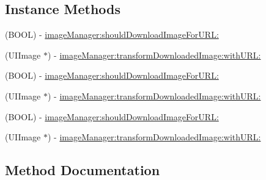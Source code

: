 \subsection*{Instance Methods}
\begin{DoxyCompactItemize}
\item 
(B\+O\+OL) -\/ \mbox{\hyperlink{protocol_s_d_web_image_manager_delegate_01-p_abb8b74284f0c06034a5a3b4f5da4f45e}{image\+Manager\+:should\+Download\+Image\+For\+U\+R\+L\+:}}
\item 
(U\+I\+Image $\ast$) -\/ \mbox{\hyperlink{protocol_s_d_web_image_manager_delegate_01-p_a6d50b06d616092913f7a99093723638e}{image\+Manager\+:transform\+Downloaded\+Image\+:with\+U\+R\+L\+:}}
\item 
(B\+O\+OL) -\/ \mbox{\hyperlink{protocol_s_d_web_image_manager_delegate_01-p_abb8b74284f0c06034a5a3b4f5da4f45e}{image\+Manager\+:should\+Download\+Image\+For\+U\+R\+L\+:}}
\item 
(U\+I\+Image $\ast$) -\/ \mbox{\hyperlink{protocol_s_d_web_image_manager_delegate_01-p_a6d50b06d616092913f7a99093723638e}{image\+Manager\+:transform\+Downloaded\+Image\+:with\+U\+R\+L\+:}}
\item 
(B\+O\+OL) -\/ \mbox{\hyperlink{protocol_s_d_web_image_manager_delegate_01-p_abb8b74284f0c06034a5a3b4f5da4f45e}{image\+Manager\+:should\+Download\+Image\+For\+U\+R\+L\+:}}
\item 
(U\+I\+Image $\ast$) -\/ \mbox{\hyperlink{protocol_s_d_web_image_manager_delegate_01-p_a6d50b06d616092913f7a99093723638e}{image\+Manager\+:transform\+Downloaded\+Image\+:with\+U\+R\+L\+:}}
\end{DoxyCompactItemize}


\subsection{Method Documentation}
\mbox{\label{protocol_s_d_web_image_manager_delegate_01-p_abb8b74284f0c06034a5a3b4f5da4f45e}} 
